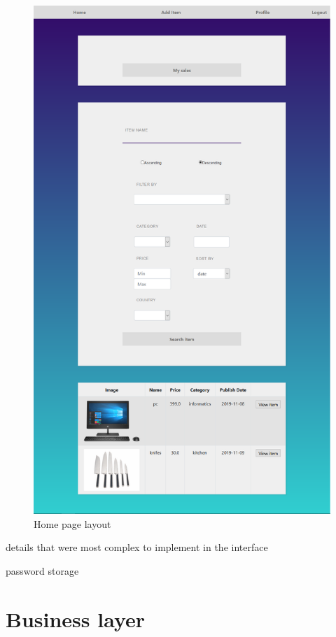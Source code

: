 \documentclass{article}
\begin{document}
\begin{figure}[hbt!]
 \centering
 \includegraphics[scale=0.30]{homePage.png}
 \caption{Home page layout }
\end{figure}

\qquad details that were most complex to implement in the interface

\qquad password storage




\section{Business layer}
\end{document}
